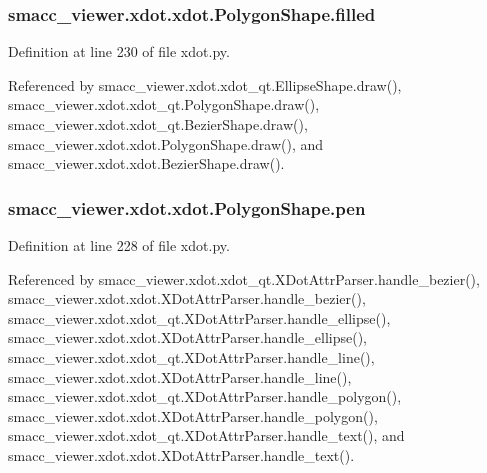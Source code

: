 \subsubsection[{\texorpdfstring{filled}{filled}}]{\setlength{\rightskip}{0pt plus 5cm}smacc\+\_\+viewer.\+xdot.\+xdot.\+Polygon\+Shape.\+filled}\hypertarget{classsmacc__viewer_1_1xdot_1_1xdot_1_1PolygonShape_ac9db183c34593ef8b830cf2f06458720}{}\label{classsmacc__viewer_1_1xdot_1_1xdot_1_1PolygonShape_ac9db183c34593ef8b830cf2f06458720}


Definition at line 230 of file xdot.\+py.



Referenced by smacc\+\_\+viewer.\+xdot.\+xdot\+\_\+qt.\+Ellipse\+Shape.\+draw(), smacc\+\_\+viewer.\+xdot.\+xdot\+\_\+qt.\+Polygon\+Shape.\+draw(), smacc\+\_\+viewer.\+xdot.\+xdot\+\_\+qt.\+Bezier\+Shape.\+draw(), smacc\+\_\+viewer.\+xdot.\+xdot.\+Polygon\+Shape.\+draw(), and smacc\+\_\+viewer.\+xdot.\+xdot.\+Bezier\+Shape.\+draw().

\subsubsection[{\texorpdfstring{pen}{pen}}]{\setlength{\rightskip}{0pt plus 5cm}smacc\+\_\+viewer.\+xdot.\+xdot.\+Polygon\+Shape.\+pen}\hypertarget{classsmacc__viewer_1_1xdot_1_1xdot_1_1PolygonShape_aa8dddefcc331a263a7e1eadcd1d9d8e1}{}\label{classsmacc__viewer_1_1xdot_1_1xdot_1_1PolygonShape_aa8dddefcc331a263a7e1eadcd1d9d8e1}


Definition at line 228 of file xdot.\+py.



Referenced by smacc\+\_\+viewer.\+xdot.\+xdot\+\_\+qt.\+X\+Dot\+Attr\+Parser.\+handle\+\_\+bezier(), smacc\+\_\+viewer.\+xdot.\+xdot.\+X\+Dot\+Attr\+Parser.\+handle\+\_\+bezier(), smacc\+\_\+viewer.\+xdot.\+xdot\+\_\+qt.\+X\+Dot\+Attr\+Parser.\+handle\+\_\+ellipse(), smacc\+\_\+viewer.\+xdot.\+xdot.\+X\+Dot\+Attr\+Parser.\+handle\+\_\+ellipse(), smacc\+\_\+viewer.\+xdot.\+xdot\+\_\+qt.\+X\+Dot\+Attr\+Parser.\+handle\+\_\+line(), smacc\+\_\+viewer.\+xdot.\+xdot.\+X\+Dot\+Attr\+Parser.\+handle\+\_\+line(), smacc\+\_\+viewer.\+xdot.\+xdot\+\_\+qt.\+X\+Dot\+Attr\+Parser.\+handle\+\_\+polygon(), smacc\+\_\+viewer.\+xdot.\+xdot.\+X\+Dot\+Attr\+Parser.\+handle\+\_\+polygon(), smacc\+\_\+viewer.\+xdot.\+xdot\+\_\+qt.\+X\+Dot\+Attr\+Parser.\+handle\+\_\+text(), and smacc\+\_\+viewer.\+xdot.\+xdot.\+X\+Dot\+Attr\+Parser.\+handle\+\_\+text().

